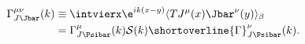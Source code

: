 \begin{equation*}
\begin{split}
  \Gamma_{J\smash[t]{\Jbar}}^{\mu\nu}(k)&\equiv\intvierx 
  \e^{ik(x-y)}\langle T J^\mu(x)\Jbar^{\nu}(y)\rangle_\beta\\
  &=\Gamma_{J\smash[t]{\Psibar}}^\mu(k)\mathcal{S}(k)
  \shortoverline{\Gamma}_{J\smash[t]{\Psibar}}^\nu(k).
\end{split}
\end{equation*}

